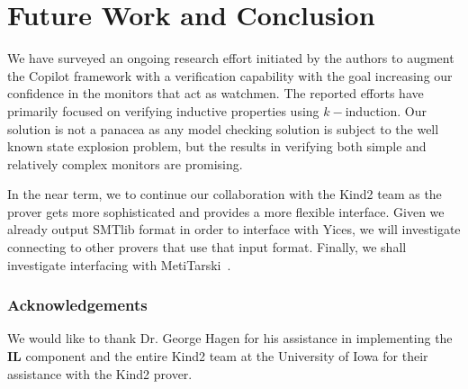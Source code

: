 \section{Future Work and Conclusion}\label{sec:conclusion}
We have surveyed an ongoing research effort initiated by the authors
to augment the  Copilot framework
with a  verification capability  with the  goal  increasing our confidence in
the monitors that act as watchmen.  The reported efforts have
primarily focused on verifying inductive properties using
$k-$induction. Our solution is not a panacea as any model checking
solution is subject to the well known state explosion problem, but 
the results in verifying both simple and relatively complex monitors
are promising. 

 In the near term, we to continue our collaboration with the Kind2
 team as the prover gets more sophisticated and provides a more
 flexible interface. Given we already output SMTlib format in order to
 interface with Yices, we will investigate connecting to other provers
 that use that input format. Finally, we shall investigate interfacing
 with MetiTarski~\cite{TTT}.


\subsubsection{Acknowledgements} We would like to thank Dr. George Hagen
for his assistance in implementing the {\bf IL} component and the
entire Kind2 team at the University of Iowa for their assistance with
the Kind2 prover. 
